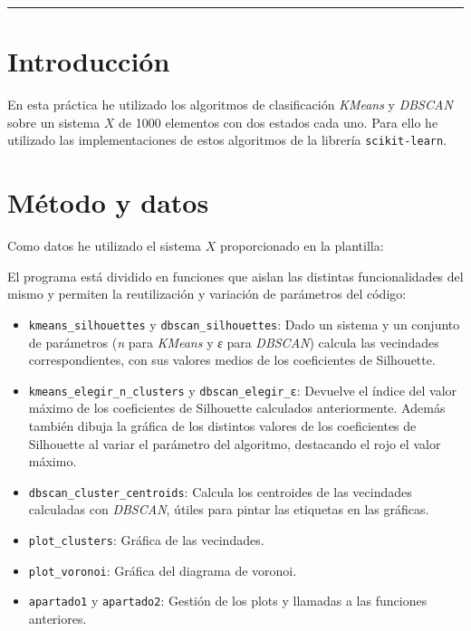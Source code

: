 \documentclass[10pt, spanish]{article}
\theoremstyle{definition}
\theoremstyle{break}
\begin{document}
 \noindent\rule{17cm}{1pt}

\section{Introducción}

En esta práctica he utilizado los algoritmos de clasificación \textit{KMeans} y
\textit{DBSCAN} sobre un sistema $X$ de 1000 elementos con dos estados cada uno.
Para ello he utilizado las implementaciones de estos algoritmos de la librería
\texttt{scikit-learn}.

\section{Método y datos}

Como datos he utilizado el sistema $X$ proporcionado en la plantilla: 



El programa está dividido en funciones que aislan las distintas funcionalidades
del mismo y permiten la reutilización y variación de parámetros del código:
\begin{itemize}
    \item \texttt{kmeans\_silhouettes} y \texttt{dbscan\_silhouettes}: Dado un
        sistema y un conjunto de parámetros (\textit{n} para \textit{KMeans} y
        \textit{ε} para \textit{DBSCAN}) calcula las vecindades
        correspondientes, con sus valores medios de los coeficientes de
        Silhouette.
    \item \texttt{kmeans\_elegir\_n\_clusters} y \texttt{dbscan\_elegir\_ε}:
        Devuelve el índice del valor máximo de los coeficientes de Silhouette
        calculados anteriormente. Además también dibuja la gráfica de los
        distintos valores de los coeficientes de Silhouette al variar el
        parámetro del algoritmo, destacando el rojo el valor máximo.
    \item \texttt{dbscan\_cluster\_centroids}:
        Calcula los centroides de las vecindades calculadas con \textit{DBSCAN},
        útiles para pintar las etiquetas en las gráficas.
    \item \texttt{plot\_clusters}:
        Gráfica de las vecindades.
    \item \texttt{plot\_voronoi}:
        Gráfica del diagrama de voronoi.
    \item \texttt{apartado1} y \texttt{apartado2}:
        Gestión de los plots y llamadas a las funciones anteriores.
\end{itemize}
\end{document}
